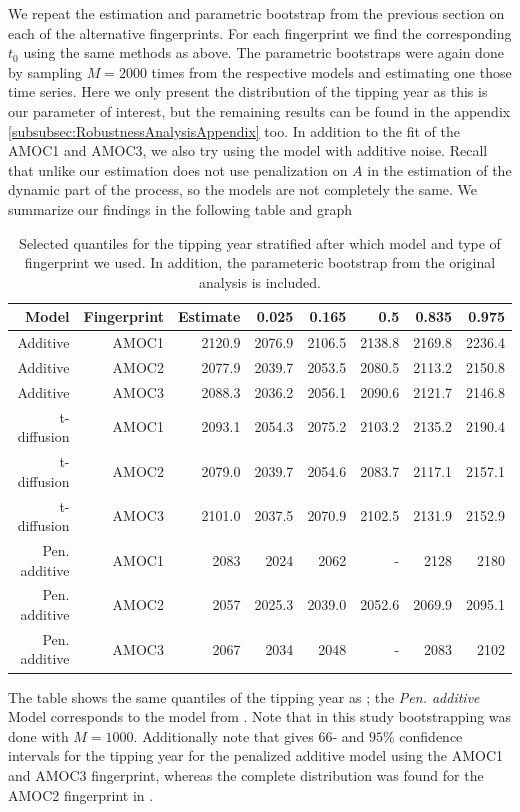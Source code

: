 We repeat the estimation and parametric bootstrap from the previous section on each of the alternative fingerprints. For each fingerprint we find the corresponding $t_0$ using the same methods as above. The parametric bootstraps were again done by sampling $M = 2000$ times from the respective models and estimating one those time series. Here we only present the distribution of the tipping year as this is our parameter of interest, but the remaining results can be found in the appendix \ref{subsubsec:RobustnessAnalysisAppendix} too. In addition to the fit of the AMOC1 and AMOC3, we also try using the model with additive noise. Recall that unlike \cite{Ditlevsen2023} our estimation does not use penalization on $A$ in the estimation of the dynamic part of the process, so the models are not completely the same. We summarize our findings in the following table and graph
\begin{table}[ht]
    \centering
    \begin{tabular}{rrrrrrrr}
    Model & Fingerprint & Estimate    & 0.025  & 0.165  & 0.5    & 0.835  & 0.975 \\ 
      \hline
    Additive & AMOC1 & 2120.9         & 2076.9 & 2106.5 & 2138.8 & 2169.8 & 2236.4 \\
    Additive & AMOC2 & 2077.9         & 2039.7 & 2053.5 & 2080.5 & 2113.2 & 2150.8 \\ 
    Additive & AMOC3 & 2088.3         & 2036.2 & 2056.1 & 2090.6 & 2121.7 & 2146.8 \\ \hline 
    t-diffusion & AMOC1 & 2093.1      & 2054.3 & 2075.2 & 2103.2 & 2135.2 & 2190.4 \\ 
    t-diffusion & AMOC2 & 2079.0      & 2039.7 & 2054.6 & 2083.7 & 2117.1 & 2157.1 \\ 
    t-diffusion & AMOC3 & 2101.0      & 2037.5 & 2070.9 & 2102.5 & 2131.9 & 2152.9 \\ 
    \hline 
    Pen. additive& AMOC1 & 2083       & 2024 & 2062 & - & 2128 & 2180 \\
    Pen. additive& AMOC2 & 2057       & 2025.3 & 2039.0 & 2052.6 & 2069.9 & 2095.1 \\ 
    Pen. additive& AMOC3 & 2067       & 2034 & 2048 & - & 2083 & 2102 \\
       \hline
    \end{tabular}
    \caption{Selected quantiles for the tipping year stratified after which model and type of fingerprint we used. In addition, the parameteric bootstrap from the original analysis \cite{Ditlevsen2023} is included.}
    \label{table:tipping_quantiles}
\end{table}
The table shows the same quantiles of the tipping year as \cite{DitlevsenSupplementary}; the \textit{Pen. additive} Model corresponds to the model from \cite{Ditlevsen2023}. Note that in this study bootstrapping was done with $M = 1000$. Additionally note that \cite[table 1]{Ditlevsen2023} gives $66$- and $95\%$ confidence intervals for the tipping year for the penalized additive model using the AMOC1 and AMOC3 fingerprint, whereas the complete distribution was found for the AMOC2 fingerprint in \cite{DitlevsenSupplementary}.

